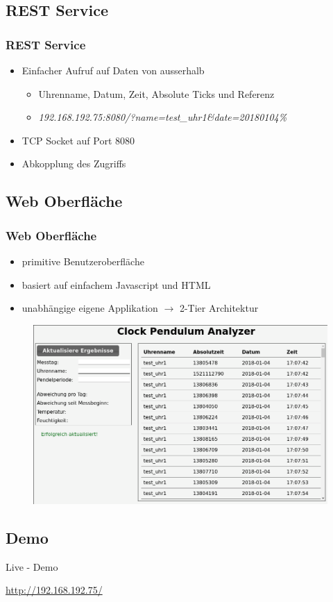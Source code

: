 \subsection{REST Service}
\begin{frame}
    \frametitle{REST Service}
    \begin{itemize}
        \item Einfacher Aufruf auf Daten von ausserhalb
        \begin{itemize}
            \item Uhrenname, Datum, Zeit, Absolute Ticks und Referenz
            \item \textit{192.168.192.75:8080/?name=test\_uhr1\&date=20180104\%}
        \end{itemize}
        \item TCP Socket auf Port 8080
        \item Abkopplung des Zugriffs
    \end{itemize}
\end{frame}

\subsection{Web Oberfläche}
\begin{frame}
    \frametitle{Web Oberfläche}
    \begin{itemize}
        \item primitive Benutzeroberfläche
        \item basiert auf einfachem Javascript und HTML
        \item unabhängige eigene Applikation $\rightarrow$ 2-Tier Architektur
    \end{itemize}
    \begin{figure}
        \centering
        \includegraphics[width=.7\textwidth]{browser.png}
    \end{figure}
\end{frame}

\subsection{Demo}
\begin{frame}
\centering
{\LARGE Live - Demo}
\vspace{1.5cm}

\color{blue}\url{http://192.168.192.75/}
\end{frame}